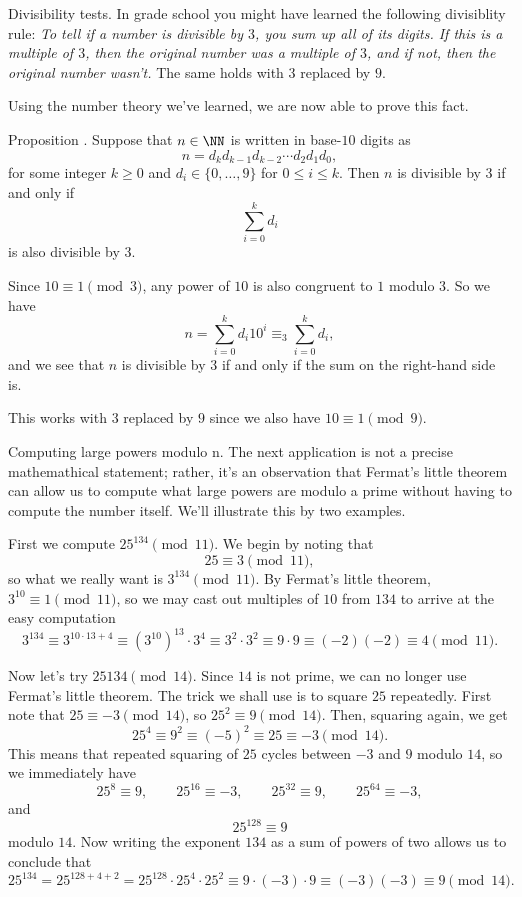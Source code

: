 \medskip\boldlabel Divisibility tests.
In grade school you might have learned the following divisiblity rule:
{\sl To tell if a number is divisible by $3$, you sum up all of its digits. If this is a
multiple of $3$, then the original number was a multiple of $3$, and if not, then the original
number wasn't.} The same holds with $3$ replaced by $9$.

Using the number theory we've learned, we are now able to prove this fact.

\proclaim Proposition \advthm. Suppose that $n\in \NN$ is written in base-$10$ digits as
$$n = d_k d_{k-1} d_{k-2}\cdots d_2 d_1 d_0,$$
for some integer $k\ge 0$ and $d_i\in \{0,\ldots,9\}$ for $0\le i\le k$.
Then $n$ is divisible by $3$ if and only if
$$\sum_{i=0}^k d_i$$
is also divisible by $3$.

\proof Since $10\equiv 1\pmod 3$, any power of $10$ is also congruent to $1$ modulo $3$. So we have
$$n = \sum_{i=0}^k d_i 10^i \equiv_3 \sum_{i=0}^k d_i,$$
and we see that $n$ is divisible by $3$ if and only if the sum on the right-hand side is.\slug

This works with $3$ replaced by $9$ since we also have $10\equiv 1\pmod 9$.

\medskip\boldlabel Computing large powers modulo {\mathbold n}.
The next application is not a precise mathemathical statement; rather, it's an observation
that Fermat's little theorem can allow us to compute what large powers are modulo a prime
without having to compute the number itself. We'll illustrate this by two examples.

First we compute $25^{134} \pmod{11}$. We begin by noting that
$$25\equiv 3\pmod{11},$$
so what we really want is $3^{134}\pmod{11}$. By Fermat's little theorem, $3^{10}\equiv 1\pmod{11}$,
so we may cast out multiples of $10$ from $134$ to arrive at the easy computation
$$3^{134} \equiv 3^{10\cdot 13+4} \equiv (3^{10})^{13}\cdot 3^4 \equiv 3^2 \cdot 3^2
\equiv 9\cdot 9\equiv (-2)(-2) \equiv 4\pmod{11}.$$

Now let's try $25{134} \pmod{14}$. Since $14$ is not prime, we can no longer use Fermat's little theorem.
The trick we shall use is to square $25$ repeatedly. First note that $25\equiv -3 \pmod{14}$,
so $25^2 \equiv 9\pmod{14}$. Then, squaring again, we get
$$25^4 \equiv 9^2 \equiv (-5)^2 \equiv 25\equiv -3\pmod{14}.$$
This means that repeated squaring of $25$ cycles between $-3$ and $9$ modulo $14$, so we immediately
have
$$25^8\equiv 9,\qquad 25^{16} \equiv -3,\qquad 25^{32}\equiv 9,\qquad 25^{64} \equiv -3,$$
and
$$25^{128}\equiv 9$$
modulo $14$. Now writing the exponent $134$ as a sum of powers of two allows us to conclude that
$$ 25^{134} = 25^{128+4+2} = 25^{128}\cdot 25^4 \cdot 25^2 \equiv 9\cdot (-3)\cdot 9 \equiv (-3)(-3)
\equiv 9\pmod{14}.$$

